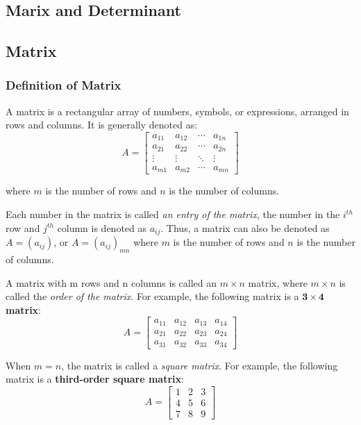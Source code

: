 \documentclass{report}
\begin{document}
\begin{multicols}{2}

    \chapter{Marix and Determinant}
    \section{Matrix}

    \subsection*{Definition of Matrix}

    \doublespacing{}
    A matrix is a rectangular array of numbers, symbols, or expressions, arranged
    in rows and columns. It is generally denoted as:
    \[
        A = \begin{bmatrix}
            a_{11} & a_{12} & \cdots & a_{1n} \\
            a_{21} & a_{22} & \cdots & a_{2n} \\
            \vdots & \vdots & \ddots & \vdots \\
            a_{m1} & a_{m2} & \cdots & a_{mn}
        \end{bmatrix}
    \]

    where $m$ is the number of rows and $n$ is the number of columns.

    Each number in the matrix is called \emph{an entry of the matrix}, the number
    in the $i^{th}$ row and $j^{th}$ column is denoted as $a_{ij}$. Thus, a matrix
    can also be denoted as $A = (a_{ij})$, or $A = {(a_{ij})}_{mn}$ where $m$ is
    the number of rows and $n$ is the number of columns.

    A matrix with m rows and n columns is called an $m \times n$ matrix, where $m
        \times n$ is called the \emph{order of the matrix}. For example, the following
    matrix is a \textbf{$\mathbf{3 \times 4}$ matrix}:
    \[
        A = \begin{bmatrix}
            a_{11} & a_{12} & a_{13} & a_{14} \\
            a_{21} & a_{22} & a_{23} & a_{24} \\
            a_{31} & a_{32} & a_{33} & a_{34}
        \end{bmatrix}
    \]

    When $m = n$, the matrix is called a \emph{square matrix}. For example, the
    following matrix is a \textbf{third-order square matrix}:
    \[
        A = \begin{bmatrix}
            1 & 2 & 3 \\
            4 & 5 & 6 \\
            7 & 8 & 9
        \end{bmatrix}
    \]


\end{multicols}
\end{document}
